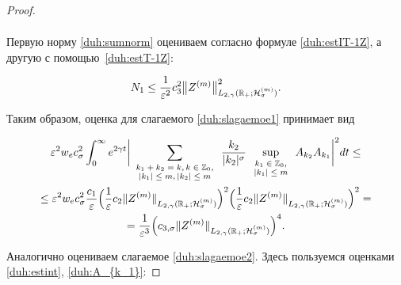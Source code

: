 \begin{proof}
\begin{multline}
\label{duh:sumnorm}

\end{multline}

Первую норму \eqref{duh:sumnorm} оцениваем согласно формуле \eqref{duh:estIT-1Z}, а другую с помощью~\eqref{duh:estT-1Z}:

\begin{equation}

N_1\le \frac1{\varepsilon^2} c_3^2 \bigl\|Z^{(m)} \bigr\|^2_{L_{2,\gamma}(\mathbb R_{+};{\cal H}^{(m)}_{\sigma})}.

\label{duh:A_{k_1}}

\end{equation}

Таким образом, оценка для слагаемого \eqref{duh:slagaemoe1} принимает вид

\begin{multline*}

\varepsilon^2 w_e c_\sigma^2\int_0^\infty e^{2\gamma t} 

\biggl|\sum_{

\scriptsize

\begin{array}{c}

k_1+k_2=k, k\in \mathbb Z_0,\\ 

|k_1|\le m,|k_2|\le m

\end{array}

}\frac{k_2}{|k_2|^\sigma}\sup_{\scriptsize \begin{array}{c} k_1\in \mathbb Z_0, \\ |k_1|\le m \end{array}} A_{k_2}A_{k_1}\biggr|^2dt\le

\\

\le \varepsilon^2 w_e c_\sigma^2\frac{c_1}{\varepsilon} 

\Bigl(\frac1\varepsilon c_2 \|Z^{(m)} \|_{L_{2,\gamma}(\mathbb R_{+};{\cal H}^{(m)}_{\sigma})}\Bigr)^2 \Bigl(\frac1\varepsilon c_2 \|Z^{(m)} \|_{L_{2,\gamma}(\mathbb R_{+};{\cal H}^{(m)}_{\sigma})}\Bigr)^2=

\\

=\frac{1}{\varepsilon^3} \Bigl(c_{3,\sigma} \|Z^{(m)} \|_{L_{2,\gamma}(\mathbb R_{+};{\cal H}^{(m)}_{\sigma})}\Bigr)^4.

\end{multline*}

Аналогично оцениваем  слагаемое \eqref{duh:slagaemoe2}. Здесь пользуемся оценками \eqref{duh:estint}, \eqref{duh:A_{k_1}}:


\end{proof}
